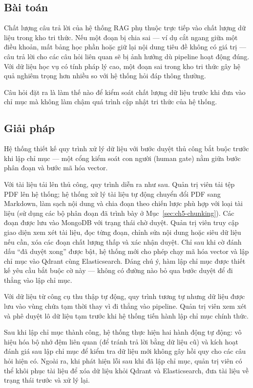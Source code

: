 \documentclass[../DoAn.tex]{subfiles}
\begin{document}
\subsection{Bài toán}

Chất lượng câu trả lời của hệ thống RAG phụ thuộc trực tiếp vào chất lượng dữ
liệu trong kho tri thức. Nếu một đoạn bị chia sai --- ví dụ cắt ngang giữa một
điều khoản, mất bảng học phần hoặc giữ lại nội dung tiêu đề không có giá trị
--- câu trả lời cho các câu hỏi liên quan sẽ bị ảnh hưởng dù pipeline hoạt động
đúng. Với dữ liệu học vụ có tính pháp lý cao, một đoạn sai trong kho tri thức
gây hệ quả nghiêm trọng hơn nhiều so với hệ thống hỏi đáp thông thường.

Câu hỏi đặt ra là làm thế nào để kiểm soát chất lượng dữ liệu trước khi đưa
vào chỉ mục mà không làm chậm quá trình cập nhật tri thức của hệ thống.

\subsection{Giải pháp}

Hệ thống thiết kế quy trình xử lý dữ liệu với bước duyệt thủ công bắt buộc
trước khi lập chỉ mục --- một cổng kiểm soát con người (human gate) nằm giữa
bước phân đoạn và bước mã hóa vector.

Với tài liệu tải lên thủ công, quy trình diễn ra như sau. Quản trị viên tải tệp
PDF lên hệ thống; hệ thống xử lý tài liệu tự động chuyển đổi PDF sang Markdown,
làm sạch nội dung và chia đoạn theo chiến lược phù hợp với loại tài liệu (sử
dụng các bộ phân đoạn đã trình bày ở Mục~\ref{sec:ch5-chunking}). Các đoạn được
lưu vào MongoDB với trạng thái chờ duyệt. Quản trị viên truy cập giao diện xem
xét tài liệu, đọc từng đoạn, chỉnh sửa nội dung hoặc siêu dữ liệu nếu cần, xóa
các đoạn chất lượng thấp và xác nhận duyệt. Chỉ sau khi cờ đánh dấu ``đã duyệt
xong'' được bật, hệ thống mới cho phép chạy mã hóa vector và lập chỉ mục vào
Qdrant cùng Elasticsearch. Đáng chú ý, hàm lập chỉ mục được thiết kế yêu cầu
bắt buộc cờ này --- không có đường nào bỏ qua bước duyệt để đi thẳng vào lập
chỉ mục.

Với dữ liệu từ công cụ thu thập tự động, quy trình tương tự nhưng dữ liệu được
lưu vào vùng chứa tạm thời thay vì đi thẳng vào pipeline. Quản trị viên xem xét
và phê duyệt lô dữ liệu tạm trước khi hệ thống tiến hành lập chỉ mục chính thức.

Sau khi lập chỉ mục thành công, hệ thống thực hiện hai hành động tự động: vô
hiệu hóa bộ nhớ đệm liên quan (để tránh trả lời bằng dữ liệu cũ) và kích hoạt
đánh giá sau lập chỉ mục để kiểm tra dữ liệu mới không gây hồi quy cho các câu
hỏi hiện có. Ngoài ra, khi phát hiện lỗi sau khi đã lập chỉ mục, quản trị viên
có thể khôi phục tài liệu để xóa dữ liệu khỏi Qdrant và Elasticsearch, đưa tài
liệu về trạng thái trước và xử lý lại.
\end{document}
